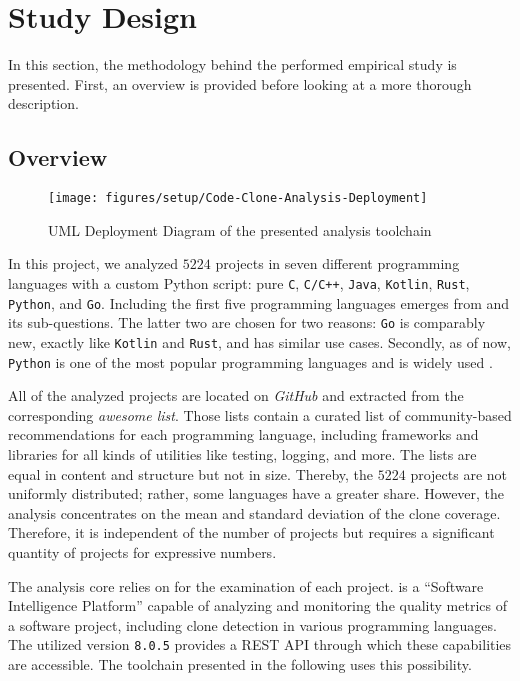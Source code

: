 
\section{Study Design}
\label{sec:study_design}

In this section, the methodology behind the performed empirical study is presented. First, an overview is provided before looking at a more thorough description.

\subsection{Overview}

\begin{figure}[tbh]
	\centering
	\texttt{[image: figures/setup/Code-Clone-Analysis-Deployment]}
	\caption{UML Deployment Diagram of the presented analysis toolchain}
	\label{fig:overview_deployment}
\end{figure}

In this project, we analyzed $5224$ projects in seven different programming languages with a custom Python script\gitFootnote{}: pure \texttt{C}, \texttt{C/C++}, \texttt{Java}, \texttt{Kotlin}, \texttt{Rust}, \texttt{Python}, and \texttt{Go}. Including the first five programming languages emerges from  and its sub-questions. The latter two are chosen for two reasons: \texttt{Go} is comparably new, exactly like \texttt{Kotlin} and \texttt{Rust}, and has similar use cases. Secondly, as of now, \texttt{Python} is one of the most popular programming languages and is widely used \cite{stackoverflow2021languages}.

All of the analyzed projects are located on \textit{GitHub} and extracted from the corresponding \textit{awesome list}\awesomeFootnote{}. Those lists contain a curated list of community-based recommendations for each programming language, including frameworks and libraries for all kinds of utilities like testing, logging, and more.
The lists are equal in content and structure but not in size. Thereby, the $5224$ projects are not uniformly distributed; rather, some languages have a greater share. However, the analysis concentrates on the mean and standard deviation of the clone coverage. Therefore, it is independent of the number of projects but requires a significant quantity of projects for expressive numbers.

The analysis core relies on \teamscale{}\teamscaleFootnote{} for the examination of each project. \teamscale{} is a ``Software Intelligence Platform'' capable of analyzing and monitoring the quality metrics of a software project, including clone detection in various programming languages. The utilized version \texttt{8.0.5} provides a REST API through which these capabilities are accessible. The toolchain presented in the following uses this possibility.

